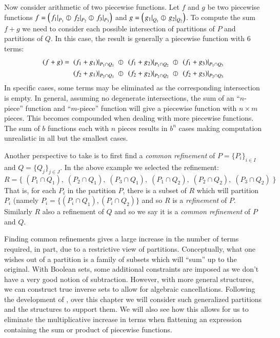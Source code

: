 Now consider arithmetic of two piecewise functions. Let $f$ and $g$ be two piecewise functions
$f = \left(\left.f_1\right|_{P_1} \varobar \left.f_2\right|_{P_2} \varobar \left.f_3\right|_{P_3} \right)$ 
and $g= \left( \left.g_1\right|_{Q_1} \varobar \left.g_2\right|_{Q_2} \right)$.
To compute the sum $f+g$ we need to consider each possible intersection of partitions of $P$ and partitions of $Q$.
In this case, the result is generally a piecewise function with 6 terms:
\begin{align*}
	(f+g) = \;
	&\left.(f_1+g_1)\right|_{P_1 \cap Q_1} 
		\;\varobar\; \left.(f_1+g_2)\right|_{P_1 \cap Q_2} 
		\;\varobar\; \left.(f_1+g_3)\right|_{P_1 \cap Q_3}\notag\\
	&\left.(f_2+g_1)\right|_{P_2 \cap Q_1} 
	 	\;\varobar\; \left.(f_2+g_2)\right|_{P_2 \cap Q_2} 
	 	\;\varobar\; \left.(f_2+g_3)\right|_{P_2 \cap Q_3}
\end{align*}
In specific cases, some terms may be eliminated as the corresponding intersection is empty. 
In general, assuming no degenerate intersections, 
the sum of an ``$n$-piece'' function and ``$m$-piece'' function will give a piecewise function with $n \times m$ pieces.
This becomes compounded when dealing with more piecewise functions. 
The sum of $b$ functions each with $n$ pieces results in $b^n$ cases making computation unrealistic 
in all but the smallest cases.


Another perspective to take is to first find a \emph{common refinement} of ${P=\{P_i\}_{i\in I}}$ 
and ${Q=\{Q_j\}_{j\in J}}$. In the above example we selected the refinement:
\begin{equation*}
	R=\Big\{\;
		(P_1 \cap Q_1),\;(P_2 \cap Q_1),\;(P_3 \cap Q_1),\;
		(P_1 \cap Q_2),\;(P_2 \cap Q_2),\;(P_3 \cap Q_2) \;
	\Big\}
\end{equation*}
That is, for each $P_i$ in the partition $P$, there is a subset of $R$ which will partition $P_i$ 
(namely $P_i = \{ (P_i \cap Q_1), (P_i \cap Q_2) \}$ and so $R$ is a \emph{refinement} of $P$.
Similarly $R$ also a refinement of $Q$ and so we say it is a \emph{common refinement} of $P$ and $Q$.


Finding common refinements gives a large increase in the number of terms required, 
in part, due to a restrictive view of partitions.
Conceptually, what one wishes out of a partition is a family of subsets which will ``sum'' up to the original.
With Boolean sets, some additional constraints are imposed as we don't have a very good notion of subtraction.
However, with more general structures, we can construct true inverse sets to allow for algebraic cancellations.
Following the development of \cite{carette2010}, over this chapter we will consider such generalized partitions 
and the structures to support them.
We will also see how this allows for us to eliminate the multiplicative increase in terms when flattening an expression
containing the sum or product of piecewise functions.





